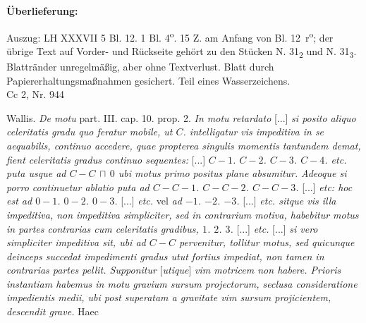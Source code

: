 \begin{ledgroupsized}[r]{120mm}
\footnotesize
\pstart
\noindent\textbf{\"{U}berlieferung:}
\pend
\end{ledgroupsized}
\begin{ledgroupsized}[r]{114mm}
\footnotesize
\pstart
\parindent -6mm
Auszug: LH XXXVII 5 Bl. 12. 1 Bl. 4\textsuperscript{o}. 15 Z. am Anfang von Bl. 12~r\textsuperscript{o}; der \"{u}brige Text auf Vorder- und R\"{u}ckseite geh\"{o}rt zu den St\"{u}cken N. 31\textsubscript{2} und N. 31\textsubscript{3}. Blattr\"{a}nder unregelm\"{a}{\ss}ig, aber ohne Textverlust. Blatt durch Papiererhaltungsmaßnahmen gesichert. Teil eines Wasserzeichens. \\Cc 2, Nr. 944
\pend
\end{ledgroupsized}

\vspace*{8mm}
\pstart
\normalsize
\noindent
[12~r\textsuperscript{o}] Wallis. \textit{De motu} part. III. cap. 10. prop. 2. \textit{In motu retardato} [...] \textit{si posito aliquo celeritatis gradu quo feratur mobile, ut $C$. intelligatur vis impeditiva in se aequabilis, continuo accedere, quae propterea singulis momentis tantundem demat, fient celeritatis gradus continuo sequentes:} [...] \textit{$C - 1$. $C - 2$. $C - 3$. $C - 4$. etc. puta usque ad $C - C \, \sqcap \, 0$ ubi motus primo positus plane absumitur.}
\pend 
\pstart \textit{Adeoque si porro continuetur ablatio puta ad $C - C - 1$. $C - C - 2$. $C - C - 3$.} [...] \textit{etc: hoc est ad $0 - 1$. $0 - 2$. $0 - 3$.} [...] \textit{etc.} vel \textit{ad $- 1$. $- 2$. $- 3$.} [...] \textit{etc. sitque vis illa impeditiva, non impeditiva simpliciter, sed in contrarium motiva, habebitur motus in partes contrarias cum celeritatis gradibus, $1$. $2$. $3$.} [...] \textit{etc.} [...] \textit{si vero simpliciter impeditiva sit, ubi ad $C - C$ pervenitur, tollitur motus, sed quicunque deinceps succedat impedimenti gradus utut fortius impediat, non tamen in contrarias partes pellit. Supponitur }[\textit{utique}]\textit{ vim motricem non habere. Prioris instantiam habemus in motu gravium sursum projectorum, seclusa consideratione impedientis medii, ubi post superatam a gravitate vim sursum projicientem, descendit grave. } Haec 
\pend 
 
